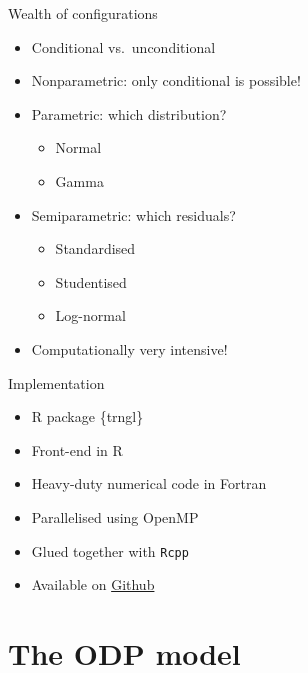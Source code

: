\documentclass[tikz]{beamer}
\begin{document}
\begin{frame}{Wealth of configurations}
    \begin{itemize}
        \item Conditional vs.\ unconditional
        \item Nonparametric: only conditional is possible!
        \item Parametric: which distribution?
              \begin{itemize}
                  \item Normal
                  \item Gamma
              \end{itemize}
        \item Semiparametric: which residuals?
              \begin{itemize}
                  \item Standardised
                  \item Studentised
                  \item Log-normal
              \end{itemize}
        \item Computationally very intensive!
    \end{itemize}
\end{frame}

\begin{frame}[label=implementation]{Implementation}
    \begin{itemize}
        \item R package \{trngl\}
        \item Front-end in R
        \item Heavy-duty numerical code in Fortran
        \item Parallelised using OpenMP
        \item Glued together with \texttt{Rcpp}
        \item Available on \href{https://github.com/oelhammouchi/trngl}{Github}
    \end{itemize}
\end{frame}

\section{The ODP model}
\end{document}
